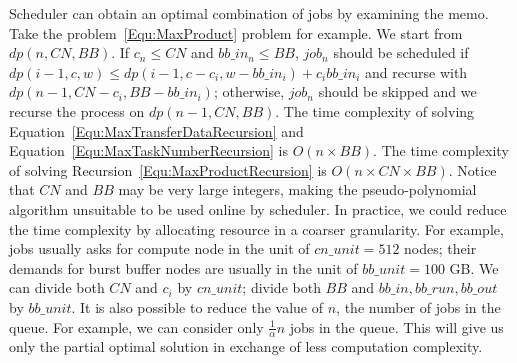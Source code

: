 Scheduler can obtain an optimal combination of jobs by examining the memo.
Take the problem~\ref{Equ:MaxProduct} problem for example.
We start from $dp(n, CN, BB)$.
If $c_n \leq CN$ and $bb\_in_n \leq BB$, $job_n$ should be scheduled if
$dp(i-1, c, w) \leq dp(i-1, c - c_i, w - bb\_in_i) + c_i bb\_in_i$ and
recurse with $dp(n - 1, CN - c_i, BB - bb\_in_i)$;
otherwise, $job_n$ should be skipped and we recurse the process on $dp(n-1, CN, BB)$.
The time complexity of solving Equation~\ref{Equ:MaxTransferDataRecursion} and
Equation~\ref{Equ:MaxTaskNumberRecursion} is $O(n\times BB)$.
The time complexity of solving Recursion~\ref{Equ:MaxProductRecursion}
is $O(n\times CN\times BB)$.
Notice that $CN$ and $BB$ may be very large integers,
making the pseudo-polynomial algorithm unsuitable
to be used online by scheduler.
In practice, we could reduce the time complexity by allocating resource
in a coarser granularity.
For example, jobs usually asks for compute node in the unit of $cn\_unit = 512$ nodes;
their demands for burst buffer nodes are usually in the unit of $bb\_unit = 100$ GB.
We can divide both $CN$ and $c_i$ by $cn\_unit$;
divide both $BB$ and $bb\_in, bb\_run, bb\_out$ by $bb\_unit$.
It is also possible to reduce the value of $n$, the number of jobs in the queue.
For example, we can consider only $\frac{1}{\alpha}n$ jobs in the queue.
This will give us only the partial optimal solution
in exchange of less computation complexity.

